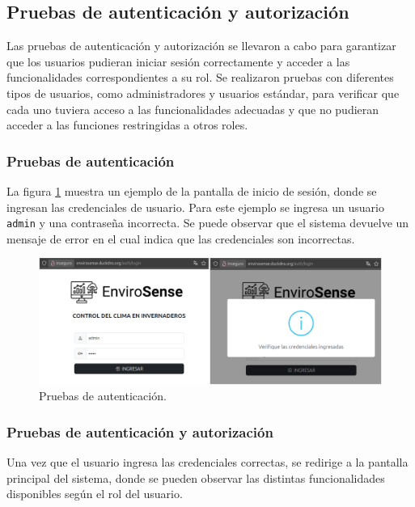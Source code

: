 \subsection{Pruebas de autenticación y autorización}

Las pruebas de autenticación y autorización se llevaron a cabo para garantizar
que los usuarios pudieran iniciar sesión correctamente y acceder a las
funcionalidades correspondientes a su rol. Se realizaron pruebas con diferentes
tipos de usuarios, como administradores y usuarios estándar, para verificar que
cada uno tuviera acceso a las funcionalidades adecuadas y que no pudieran
acceder a las funciones restringidas a otros roles.

\subsubsection{Pruebas de autenticación}

La figura \ref{fig:login} muestra un ejemplo de la pantalla de inicio de
sesión, donde se ingresan las credenciales de usuario. Para este ejemplo se
ingresa un usuario \texttt{admin} y una contraseña incorrecta. Se puede
observar que el sistema devuelve un mensaje de error en el cual indica que las
credenciales son incorrectas.

\begin{figure}[H]
    \centering
    \includegraphics[width=\textwidth]{Images/41_intento_login.png}
    \caption[Pruebas de autenticación]{Pruebas de autenticación.}
    \label{fig:login}
\end{figure}

\subsubsection{Pruebas de autenticación y autorización}
Una vez que el usuario ingresa las credenciales correctas, se redirige a la
pantalla principal del sistema, donde se pueden observar las distintas
funcionalidades disponibles según el rol del usuario.

